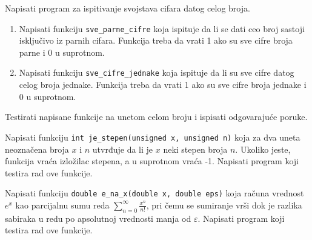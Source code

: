 \begin{Exercise}[label=v1.4_10] 
Napisati program za ispitivanje svojstava cifara datog celog broja.
\begin{enumerate}
\item Napisati funkciju \verb|sve_parne_cifre| koja ispituje da li se dati ceo broj sastoji isključivo iz parnih cifara. Funkcija treba
da vrati 1 ako su sve cifre broja parne i 0 u suprotnom. 
\item Napisati funkciju \verb|sve_cifre_jednake| koja ispituje da li su sve cifre datog celog broja jednake. Funkcija treba
da vrati 1 ako su sve cifre broja jednake i 0 u suprotnom. 
\end{enumerate}
Testirati napisane funkcije na unetom celom broju i ispisati odgovarajuće poruke.
\end{Exercise}
\begin{Answer}[ref=v1.4_10]
\end{Answer}

\begin{Exercise}[label=v1.4_11] 
Napisati funkciju 
\verb|int je_stepen(unsigned x, unsigned n)|
koja za dva uneta neoznačena broja $x$ i $n$ utvrđuje da li je $x$ neki stepen
broja $n$. Ukoliko jeste, funkcija vraća izložilac stepena, a u suprotnom vraća -1. Napisati program koji testira rad ove funkcije.\\ 
\end{Exercise}
\begin{Answer}[ref=v1.4_11]
\end{Answer}

\begin{Exercise}[label=v1.4_12] 
Napisati funkciju 
\verb|double e_na_x(double x, double eps)|
koja računa vrednost $e^x$ kao parcijalnu sumu reda
 $\sum_{n=0}^{\infty}\frac{x^n}{n!}$, pri čemu se sumiranje vrši dok
 je razlika sabiraka u redu po apsolutnoj vrednosti
 manja od $\varepsilon$. Napisati program koji testira rad ove funkcije.\\ 
\end{Exercise}
\begin{Answer}[ref=v1.4_12]
\end{Answer}

